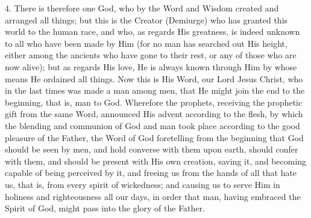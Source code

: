 \documentclass[9pt, twocolumn, oneside, a4paper]{memoir}
\newcommand{\gloss}[1]{%
    \marginpar[\RaggedLeft \footnotesize{#1}]{\RaggedRight \footnotesize{#1}}}
\begin{document}
4. There is therefore one God, who by the Word and Wisdom created and arranged all things; but this is the Creator (Demiurge) who has granted this world to the human race, and who, as regards His greatness, is indeed unknown to all who have been made by Him (for no man has searched out His height, either among the ancients who have gone to their rest, or any of those who are now alive); but as regards His love, He is always known through Him by whose means He ordained all things. Now this is His Word, our Lord Jesus Christ, who in the last times was made a man among men, that He might join the end to the beginning, that is, man to God. Wherefore the prophets, receiving the prophetic gift from the same Word, announced His advent according to the flesh, by which the blending and communion of God and man took place according to the good pleasure of the Father, the Word of God foretelling from the beginning that God should be seen by men, and hold converse with them upon earth, should confer with them, and should be present with His own creation, saving it, and becoming capable of being perceived by it, and freeing us from the hands of all that hate us, that is, from every spirit of wickedness; and causing us to serve Him in holiness and righteousness all our days, \gloss{Luke 1:71, 75} in order that man, having embraced the Spirit of God, might pass into the glory of the Father.
\end{document}
